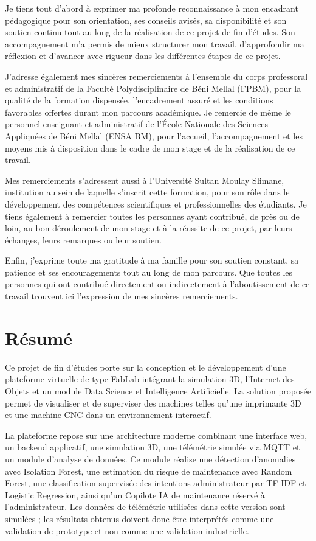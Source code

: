 \documentclass[12pt,a4paper]{report}
\newcommand{\chapterstar}[1]{%
  \chapter*{#1}%
  \markboth{#1}{#1}%
  \addcontentsline{toc}{chapter}{#1}%
}
\begin{document}
Je tiens tout d'abord à exprimer ma profonde reconnaissance à mon encadrant pédagogique pour son orientation, ses conseils avisés, sa disponibilité et son soutien continu tout au long de la réalisation de ce projet de fin d'études. Son accompagnement m'a permis de mieux structurer mon travail, d'approfondir ma réflexion et d'avancer avec rigueur dans les différentes étapes de ce projet.

J'adresse également mes sincères remerciements à l'ensemble du corps professoral et administratif de la Faculté Polydisciplinaire de Béni Mellal (FPBM), pour la qualité de la formation dispensée, l'encadrement assuré et les conditions favorables offertes durant mon parcours académique. Je remercie de même le personnel enseignant et administratif de l'École Nationale des Sciences Appliquées de Béni Mellal (ENSA BM), pour l'accueil, l'accompagnement et les moyens mis à disposition dans le cadre de mon stage et de la réalisation de ce travail.

Mes remerciements s'adressent aussi à l'Université Sultan Moulay Slimane, institution au sein de laquelle s'inscrit cette formation, pour son rôle dans le développement des compétences scientifiques et professionnelles des étudiants. Je tiens également à remercier toutes les personnes ayant contribué, de près ou de loin, au bon déroulement de mon stage et à la réussite de ce projet, par leurs échanges, leurs remarques ou leur soutien.

Enfin, j'exprime toute ma gratitude à ma famille pour son soutien constant, sa patience et ses encouragements tout au long de mon parcours. Que toutes les personnes qui ont contribué directement ou indirectement à l'aboutissement de ce travail trouvent ici l'expression de mes sincères remerciements.

\chapterstar{Résumé}

Ce projet de fin d'études porte sur la conception et le développement d'une plateforme virtuelle de type FabLab intégrant la simulation 3D, l'Internet des Objets et un module Data Science et Intelligence Artificielle. La solution proposée permet de visualiser et de superviser des machines telles qu'une imprimante 3D et une machine CNC dans un environnement interactif.

La plateforme repose sur une architecture moderne combinant une interface web, un backend applicatif, une simulation 3D, une télémétrie simulée via MQTT et un module d'analyse de données. Ce module réalise une détection d'anomalies avec Isolation Forest, une estimation du risque de maintenance avec Random Forest, une classification supervisée des intentions administrateur par TF-IDF et Logistic Regression, ainsi qu'un Copilote IA de maintenance réservé à l'administrateur. Les données de télémétrie utilisées dans cette version sont simulées ; les résultats obtenus doivent donc être interprétés comme une validation de prototype et non comme une validation industrielle.
\end{document}
